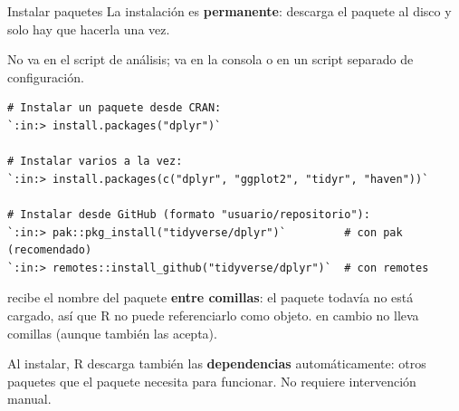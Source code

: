 \documentclass[8pt]{beamer}
\begin{document}
	\begin{frame}[fragile]{Instalar paquetes}
		La instalación es \textbf{permanente}: descarga el paquete al disco y solo hay que hacerla una vez. 
		\begin{alertblock}{}
		No va en el script de análisis; va en la consola o en un script separado de configuración.
		\end{alertblock}
		

\begin{lstlisting}[style=RConsole]
# Instalar un paquete desde CRAN:
`:in:> install.packages("dplyr")`

# Instalar varios a la vez:
`:in:> install.packages(c("dplyr", "ggplot2", "tidyr", "haven"))`

# Instalar desde GitHub (formato "usuario/repositorio"):
`:in:> pak::pkg_install("tidyverse/dplyr")`         # con pak (recomendado)
`:in:> remotes::install_github("tidyverse/dplyr")`  # con remotes
\end{lstlisting}

		\begin{alertblock}{}
			 recibe el nombre del paquete \textbf{entre comillas}: el paquete todavía no está cargado, así que R no puede referenciarlo como objeto.  en cambio no lleva comillas (aunque también las acepta).
		\end{alertblock}

		\begin{block}{}
			Al instalar, R descarga también las \textbf{dependencias} automáticamente: otros paquetes que el paquete necesita para funcionar. No requiere intervención manual.
		\end{block}
	\end{frame}
\end{document}
